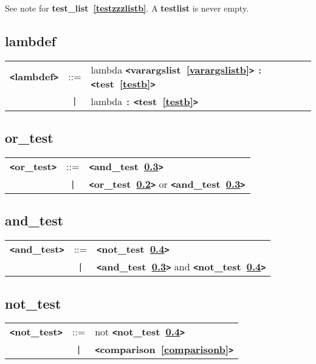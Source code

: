 \documentclass[12pt]{article}
\begin{document}
See note for {\bf test\_{}list~\ref{testzzzlistb}}.  A {\bf testlist} is never empty.

\subsection{lambdef}
\label{lambdefb}
\begin{tabular}{lcl}
{\bf \verb+<+lambdef\verb+>+} & ::=  & lambda {\bf \verb+<+varargslist~\ref{varargslistb}\verb+>+}  \verb|:| {\bf \verb+<+test~\ref{testb}\verb+>+}  \\
 & \verb+|+  & lambda \verb|:| {\bf \verb+<+test~\ref{testb}\verb+>+}  \\
\end{tabular}

\subsection{or\_test}
\label{orzzztestb}
\begin{tabular}{lcl}
{\bf \verb+<+or\_test\verb+>+} & ::=  & {\bf \verb+<+and\_test~\ref{andzzztestb}\verb+>+}  \\
 & \verb+|+  & {\bf \verb+<+or\_test~\ref{orzzztestb}\verb+>+}  or {\bf \verb+<+and\_test~\ref{andzzztestb}\verb+>+}  \\
\end{tabular}

\subsection{and\_test}
\label{andzzztestb}
\begin{tabular}{lcl}
{\bf \verb+<+and\_test\verb+>+} & ::=  & {\bf \verb+<+not\_test~\ref{notzzztestb}\verb+>+}  \\
 & \verb+|+  & {\bf \verb+<+and\_test~\ref{andzzztestb}\verb+>+}  and {\bf \verb+<+not\_test~\ref{notzzztestb}\verb+>+}  \\
\end{tabular}

\subsection{not\_test}
\label{notzzztestb}
\begin{tabular}{lcl}
{\bf \verb+<+not\_test\verb+>+} & ::=  & not {\bf \verb+<+not\_test~\ref{notzzztestb}\verb+>+}  \\
 & \verb+|+  & {\bf \verb+<+comparison~\ref{comparisonb}\verb+>+}  \\
\end{tabular}
\end{document}
